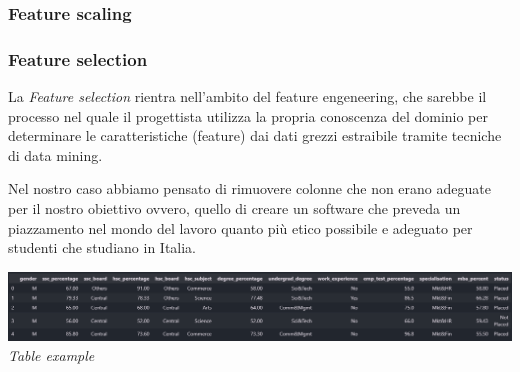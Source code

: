 \documentclass{article}
\begin{document}
\subsubsection{Feature scaling}

\subsubsection{Feature selection}
La \textit{Feature selection} rientra nell'ambito del feature engeneering, che sarebbe il processo nel quale il progettista
utilizza la propria conoscenza del dominio per determinare le caratteristiche (feature) dai dati grezzi estraibile tramite tecniche
di data mining.

Nel nostro caso abbiamo pensato di rimuovere colonne che non erano adeguate per il nostro obiettivo ovvero, quello di creare
un software che preveda un piazzamento nel mondo del lavoro quanto più etico possibile e adeguato per studenti che studiano in
Italia.

\begin{center}
    \includegraphics[scale=0.46]{csvimage.png}
    \textit{Table example}
\end{center}
\end{document}

